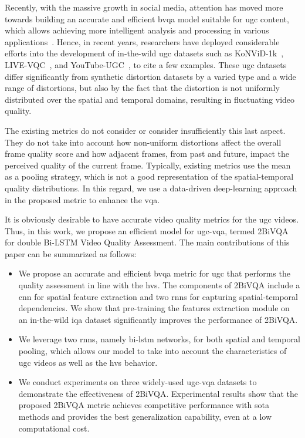 \documentclass[journal]{IEEEtran}
\begin{document}
Recently, with the massive growth in social media, attention has moved more towards building an accurate and efficient \ac{bvqa} model suitable for \ac{ugc} content, which allows achieving more intelligent analysis and processing in various applications~\cite{zhang2015aesthetics}. Hence, in recent years, researchers have deployed considerable efforts into the development of in-the-wild \ac{ugc} datasets such as KoNViD-1k~\cite{hosu2017konstanz}, LIVE-VQC~\cite{sinno2018large}, and YouTube-UGC~\cite{wang2019youtube}, to cite a few examples. These \ac{ugc} datasets differ significantly from synthetic distortion datasets by a varied type and a wide range of distortions, but also by the fact that the distortion is not uniformly distributed over the spatial and temporal domains, resulting in fluctuating video quality.

The existing metrics do not consider or consider insufficiently this last aspect. They do not take into account how non-uniform distortions affect the overall frame quality score and how adjacent frames, from past and future, impact the perceived quality of the current frame. Typically, existing metrics use the mean as a pooling strategy, which is not a good representation of the spatial-temporal quality distributions. In this regard, we use a data-driven deep-learning approach in the proposed metric to enhance the \ac{vqa}.

It is obviously desirable to have accurate video quality metrics for the \ac{ugc} videos. Thus, in this work, we propose an efficient model for \ac{ugc}-\ac{vqa}, termed 2BiVQA for double Bi-LSTM Video Quality Assessment. The main contributions of this paper can be summarized
as follows:
\begin{itemize}
  \item We propose an accurate and efficient \ac{bvqa} metric for \ac{ugc} that performs the quality assessment in line with the \ac{hvs}. The components of 2BiVQA include a \ac{cnn} for spatial feature extraction and two \acp{rnn} for capturing spatial-temporal dependencies. We show that pre-training the features extraction module on an in-the-wild \ac{iqa} dataset significantly improves the performance of 2BiVQA.
  \item We leverage two \acp{rnn}, namely \ac{bi-lstm} networks, for both spatial and temporal pooling, which allows our model to take into account the characteristics of \ac{ugc} videos as well as the \ac{hvs} behavior.
  \item We conduct experiments on three  widely-used \ac{ugc}-\ac{vqa} datasets to demonstrate the effectiveness of 2BiVQA. Experimental results show that the proposed 2BiVQA metric achieves competitive performance with \ac{sota} methods and provides the best generalization capability, even at a low computational cost.
 

\end{itemize}
\end{document}
